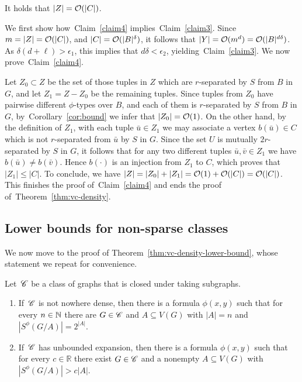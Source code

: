   \begin{claim}\label{claim4}
It holds that $|Z|=\mathcal{O}(|C|)$.
  \end{claim}
  
  We first show how~Claim~\ref{claim4} implies~Claim~\ref{claim3}.
  Since $m=|Z|=\mathcal{O}(|C|)$, and $|C|=\mathcal{O}(|B|^\delta)$, it follows that
  $|Y|=\mathcal{O}(m^d)=\mathcal{O}(|B|^{d\delta})$. As $\delta(d+\ell)>\epsilon_1$,
  this implies that $d\delta<\epsilon_2$, yielding~Claim~\ref{claim3}.
  We now prove~Claim~\ref{claim4}.

  \medskip Let $Z_0\subset Z$ be the set of those tuples in $Z$ which
  are $r$-separated by $S$ from $B$ in $G$, and let $Z_1=Z-Z_0$ be the
  remaining tuples.  Since tuples from $Z_0$ have pairwise different
  $\phi$-types over $B$, and each of them is $r$-separated by $S$ from
  $B$ in $G$, by~Corollary~\ref{cor:bound} we infer that
  $|Z_0|=\mathcal{O}(1)$.  On the other hand, by the definition of $Z_1$,
  with each tuple $\bar u\in Z_1$ we may associate a vertex
  $b(\bar u)\in C$ which is not $r$-separated from $\bar u$ by $S$ in
  $G$.  Since the set $U$ is mutually $2r$-separated by $S$ in $G$, it
  follows that for any two different tuples $\bar u,\bar v\in Z_1$ we
  have $b(\bar u)\neq b(\bar v)$.  Hence $b(\cdot)$ is an injection
  from $Z_1$ to $C$, which proves that $|Z_1|\leq |C|$.  To conclude,
  we have $|Z|=|Z_0|+|Z_1|=\mathcal{O}(1)+\mathcal{O}(|C|)=\mathcal{O}(|C|)$. This finishes
  the proof of~Claim~\ref{claim4} and ends the proof
  of~Theorem~\ref{thm:vc-density}.

  
\subsection{Lower bounds for non-sparse classes}
We now move to the proof of Theorem~\ref{thm:vc-density-lower-bound},
whose statement we repeat for convenience.


\setcounter{aux}{\value{theorem}}
\setcounter{theorem}{\value{vclower}}
\setcounter{auxsec}{\value{section}} \setcounter{section}{1}
\begin{theorem}
  Let\, $\mathscr{C}$ be a class of graphs that is closed under taking
  subgraphs.
  \begin{enumerate}
  \item If\, $\mathscr{C}$ is not nowhere dense, then there is a formula
    $\phi(x,y)$ such that for every $n\in \mathbb{N}$ there are $G\in\mathscr{C}$ and
    $A\subseteq V(G)$ with $|A|=n$ and $|S^\phi(G/A)|=2^{|A|}$.
  \item If\, $\mathscr{C}$ has unbounded expansion, then there is a formula
    $\phi(x,y)$ such that for every $c\in \mathbb{R}$ there exist
    $G\in\mathscr{C}$ and a nonempty $A\subseteq V(G)$ with
    $|S^\phi(G/A)|>c|A|$.
  \end{enumerate}
\end{theorem}
\setcounter{theorem}{\value{aux}} \setcounter{section}{\value{auxsec}}
 
